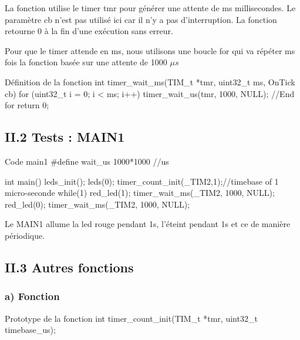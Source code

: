 La fonction utilise le timer tmr pour générer une attente de ms millisecondes. Le paramètre cb n'est pas utilisé ici car il n'y a pas d'interruption. La fonction retourne 0 à la fin d'une exécution sans erreur.


Pour que le timer attende en ms, nous utilisons une boucle for qui va répéter ms fois la fonction  basée sur une attente de 1000 $\mu s$ \\


\begin{Cpp}{Définition de la fonction} 
int timer_wait_ms(TIM_t *tmr, uint32_t ms, OnTick cb) 
{
		for (uint32_t i = 0; i < ms; i++)
		{
			timer_wait_us(tmr, 1000, NULL);
		}//End for
	    return 0;
}
\end{Cpp}





\newpage
\subsection{II.2 Tests : MAIN1}

\begin{Cpp}{Code main1} 
#define wait_us           1000*1000   //us

int main()
{    
    leds_init();
    leds(0);
    timer_count_init(_TIM2,1);//timebase of 1 micro-seconde
    while(1)
    {
        red_led(1);
        timer_wait_ms(_TIM2, 1000, NULL);
        red_led(0);
        timer_wait_ms(_TIM2, 1000, NULL);
    }        
}   
\end{Cpp}

Le MAIN1 allume la led rouge pendant 1s, l'éteint pendant 1s et ce de manière périodique.


\newpage
\subsection{II.3 Autres fonctions}
\subsubsection{a) Fonction}
\begin{Cpp}{Prototype de la fonction} 
int timer_count_init(TIM_t *tmr, uint32_t timebase_us);
\end{Cpp}

